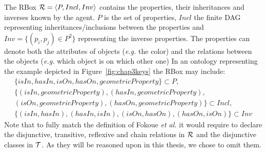 \documentclass[a4paper,11pt,twoside]{StyleThese}
\begin{document}
The RBox $\mathcal{R} = \langle P, Incl, Inv \rangle$ contains the properties, their inheritances and inverses known by the agent. $P$ is the set of properties, $Incl$ the finite DAG representing inheritances/inclusions between the properties and $Inv = \{(p_i, p_j) \in P^2\}$ representing the inverse properties. The properties can denote both the attributes of objects (\textit{e.g.} the color) and the relations between the objects (\textit{e.g.} which object is on which other one) In an ontology representing the example depicted in Figure~\ref{fig:chap3keys} the RBox may include: 
\begin{multline*}
\{isIn, hasIn, isOn, hasOn, geometricProperty\} \subset P,\\
\{(isIn, geometricProperty), (hasIn, geometricProperty),\\
(isOn, geometricProperty), (hasOn, geometricProperty)\} \subset Incl,\\
\{(isIn, hasIn), (hasIn, isIn), (isOn, hasOn), (hasOn, isOn)\} \subset Inv
\end{multline*}
Note that to fully match the definition of Fokoue \textit{et al.} \cite{fokoue2006summary} it would require to declare the disjunctive, transitive, reflexive and chain relations in $\mathcal{R}$ and the disjunctive classes in $\mathcal{T}$. As they will be reasoned upon in this thesis, we chose to omit them.
\end{document}

